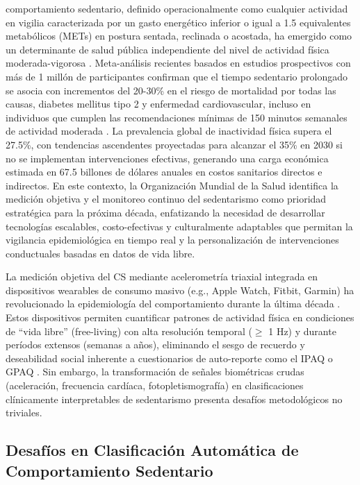 \documentclass[journal,twoside,web]{ieeecolor}
\begin{document}
 comportamiento sedentario, definido operacionalmente como cualquier actividad en vigilia caracterizada por un gasto energético inferior o igual a 1.5 equivalentes metabólicos (METs) en postura sentada, reclinada o acostada, ha emergido como un determinante de salud pública independiente del nivel de actividad física moderada-vigorosa \cite{Bull2020,WHO2020}. Meta-análisis recientes basados en estudios prospectivos con más de 1 millón de participantes confirman que el tiempo sedentario prolongado se asocia con incrementos del 20-30\% en el riesgo de mortalidad por todas las causas, diabetes mellitus tipo 2 y enfermedad cardiovascular, incluso en individuos que cumplen las recomendaciones mínimas de 150 minutos semanales de actividad moderada \cite{Guthold2020}. La prevalencia global de inactividad física supera el 27.5\%, con tendencias ascendentes proyectadas para alcanzar el 35\% en 2030 si no se implementan intervenciones efectivas, generando una carga económica estimada en 67.5 billones de dólares anuales en costos sanitarios directos e indirectos. En este contexto, la Organización Mundial de la Salud identifica la medición objetiva y el monitoreo continuo del sedentarismo como prioridad estratégica para la próxima década, enfatizando la necesidad de desarrollar tecnologías escalables, costo-efectivas y culturalmente adaptables que permitan la vigilancia epidemiológica en tiempo real y la personalización de intervenciones conductuales basadas en datos de vida libre.

La medición objetiva del CS mediante acelerometría triaxial integrada en dispositivos wearables de consumo masivo (e.g., Apple Watch, Fitbit, Garmin) ha revolucionado la epidemiología del comportamiento durante la última década \cite{Henriksen2018,Doherty2021}. Estos dispositivos permiten cuantificar patrones de actividad física en condiciones de ``vida libre'' (free-living) con alta resolución temporal ($\geq$ 1 Hz) y durante períodos extensos (semanas a años), eliminando el sesgo de recuerdo y deseabilidad social inherente a cuestionarios de auto-reporte como el IPAQ o GPAQ \cite{White2019,Strain2020}. Sin embargo, la transformación de señales biométricas crudas (aceleración, frecuencia cardíaca, fotopletismografía) en clasificaciones clínicamente interpretables de sedentarismo presenta desafíos metodológicos no triviales.

\subsection{Desafíos en Clasificación Automática de Comportamiento Sedentario}
\end{document}
